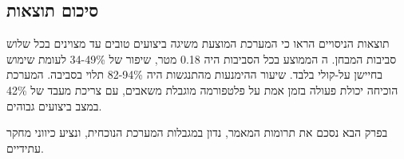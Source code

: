 \subsection{סיכום תוצאות}
\label{sec:ch08_summary}

תוצאות הניסויים הראו כי המערכת המוצעת משיגה ביצועים טובים עד מצוינים בכל שלוש סביבות המבחן. ה הממוצע בכל הסביבות היה 0.18 מטר, שיפור של 34-49\% לעומת שימוש בחיישן על-קולי בלבד. שיעור ההימנעות מהתנגשות היה 82-94\% תלוי בסביבה. המערכת הוכיחה יכולת פעולה בזמן אמת על פלטפורמה מוגבלת משאבים, עם צריכת מעבד של 42\% במצב ביצועים גבוהים. \cite{CrewAIDocs} \cite{Thrun2005ProbRobotics}

בפרק הבא נסכם את תרומות המאמר, נדון במגבלות המערכת הנוכחית, ונציע כיווני מחקר עתידיים.

